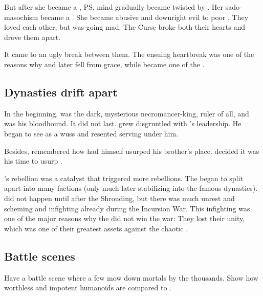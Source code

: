 But after she became a \sathariah, \ps{\Shiaraid} mind gradually became twisted by . 
Her sado-masochism became a . 
She became abusive and downright evil to poor \Eryal. 
They loved each other, but \Shiaraid{} was going mad. 
The Curse broke both their hearts and drove them apart. 

It came to an ugly break between them. 
The ensuing heartbreak was one of the reasons why \Shiaraid{} and \Mystraacht{} later fell from grace, while \Eryal{} became one of the . 









\subsection{Dynasties drift apart}
In the beginning, \Azraid was the dark, mysterious necromancer-king, ruler of all, and \Zachirah was his bloodhound. 
It did not last.
\Zachirah grew disgruntled with \Azraid's leadership. 
He began to see \Azraid as a wuss and resented serving under him. 

Besides, \Zachirah remembered how \Azraid had himself usurped his brother's place.
\Zachirah decided it was his time to usurp \Azraid. 

\Zachirah's rebellion was a catalyst that triggered more rebellions.
The \resphain began to split apart into many factions (only much later stabilizing into the famous dynasties). 
 did not happen until after the Shrouding, but there was much unrest and scheming and infighting already during the Incursion War. 
This infighting was one of the major reasons why the \resphain did not win the war: 
They lost their unity, which was one of their greatest assets against the chaotic \dragonlords. 









\subsection{Battle scenes}
Have a battle scene where a few \dragons{} mow down mortals by the thousands. 
Show how worthless and impotent humanoids are compared to \dragons.

